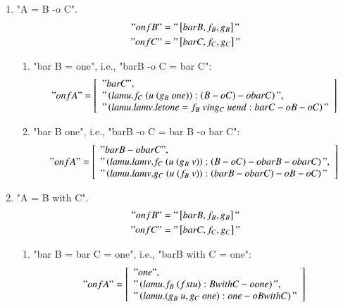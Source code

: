 \documentclass{article}
\begin{document}
\begin{enumerate}
\item "A = B -o C".
  \begin{align*}
    "onf B" &= "\left[ bar B, f_B, g_B \right]" \\
    "onf C" &= "\left[ bar C, f_C, g_C \right]"
  \end{align*}

  \begin{enumerate}
  \item "bar B = one", i.e., "bar{B -o C} = bar C":
    \begin{gather*}
      "onf A" =
      \left[ \begin{array}{l}
           "bar C", \\
           "\left( lam u. f_C\ ( u\ ( g_B\ one ) ) : (B -o C) -o bar C \right)",\\
           "\left( lam u. lam v. let one = f_B\ v in g_C\ u end : bar C -o B -o C \right)"
         \end{array} \right]
    \end{gather*}

  \item "bar B \neq one", i.e., "bar{B -o C} = bar B -o bar C":
    \begin{gather*}
      "onf A" =
      \left[ \begin{array}{l}
           "bar B -o bar C", \\
           "\left( lam u. lam v. f_C\ ( u\ ( g_B\ v ) ) : (B -o C) -o bar B -o bar C \right)",\\
           "\left( lam u. lam v. g_C\ ( u\ ( f_B\ v ) ) : ( bar B -o bar C) -o B -o C \right)"
         \end{array} \right]
    \end{gather*}
  \end{enumerate}

\item "A = B with C".
  \begin{align*}
    "onf B" &= "\left[ bar B, f_B, g_B \right]" \\
    "onf C" &= "\left[ bar C, f_C, g_C \right]"
  \end{align*}

  \begin{enumerate}
  \item "bar B = bar C = one", i.e., "bar{B with C} = one":
    \begin{gather*}
      "onf A" =
      \left[ \begin{array}{l}
           "one", \\
           "\left( lam u. f_B\ ( fst u ) : B with C -o one \right)",\\
           "\left( lam u. ( g_B\ u, g_C\ one ) : one -o B with C \right)"
         \end{array} \right]
    \end{gather*}


\end{enumerate}
\end{enumerate}
\end{document}
